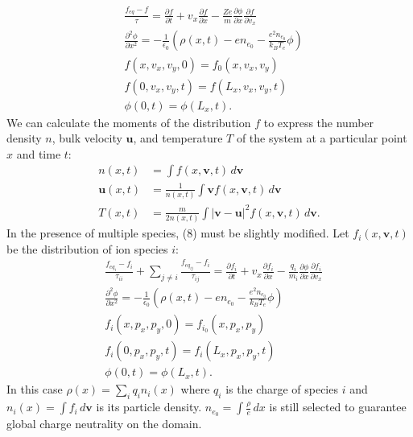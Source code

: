 \documentclass{article}
\begin{document}
\begin{equation}
\begin{split}
&\frac{f_{eq}-f}{\tau}=\frac{\partial f}{\partial t}+v_x\frac{\partial f}{\partial x}-\frac{Ze}{m}\frac{\partial\phi}{\partial x}\frac{\partial f}{\partial v_x}\\
&\frac{\partial^2 \phi}{\partial x^2}=-\frac{1}{\epsilon_0}\left(\rho(x,t)-en_{e_0}-\frac{e^2n_{e_0}}{k_BT_e}\phi\right)\\
&f(x,v_x,v_y,0)=f_0(x,v_x,v_y)\\
&f(0,v_x,v_y,t)=f(L_x,v_x,v_y,t)\\
&\phi(0,t)=\phi(L_x,t).
\end{split}\label{eq:BGK1D2V}
\end{equation}
We can calculate the moments of the distribution $f$ to express the number density $n$, bulk velocity $\mathbf{u}$, and temperature $T$ of the system at a particular point $x$ and time $t$:
\begin{align}
n(x,t)&=\int f(x,\mathbf{v},t)\,d\mathbf{v}\\
\mathbf{u}(x,t)&=\frac{1}{n(x,t)}\int \mathbf{v}f(x,\mathbf{v},t)\,d\mathbf{v}\\
T(x,t)&=\frac{m}{2n(x,t)}\int |\mathbf{v}-\mathbf{u}|^2f(x,\mathbf{v},t)\,d\mathbf{v}.
\end{align}In the presence of multiple species, (8) must be slightly modified. Let $f_i(x,\mathbf{v},t)$ be the distribution of ion species $i$:
\begin{equation}
\begin{split}
&\frac{f_{eq_i}-f_i}{\tau_{ii}}+\sum_{j\neq i}\frac{f_{eq_{ij}}-f_i}{\tau_{ij}}=\frac{\partial f_i}{\partial t}+v_x\frac{\partial f_i}{\partial x}-\frac{q_i}{m_i}\frac{\partial\phi}{\partial x}\frac{\partial f_i}{\partial v_x}\\
&\frac{\partial^2 \phi}{\partial x^2}=-\frac{1}{\epsilon_0}\left(\rho(x,t)-en_{e_0}-\frac{e^2n_{e_0}}{k_BT_e}\phi\right)\\
&f_i(x,p_x,p_y,0)=f_{i_0}(x,p_x,p_y)\\
&f_i(0,p_x,p_y,t)=f_i(L_x,p_x,p_y,t)\\
&\phi(0,t)=\phi(L_x,t).
\end{split}\label{eq:BGK1D2Vmultspec}
\end{equation}
In this case $\rho(x)=\sum_i q_i n_i(x)$ where $q_i$ is the charge of species $i$ and $n_i(x)=\int f_i\,d\mathbf{v}$ is its particle density. $n_{e_0}=\int \frac{\rho}{e}\,dx$ is still selected to guarantee global charge neutrality on the domain.
\end{document}
